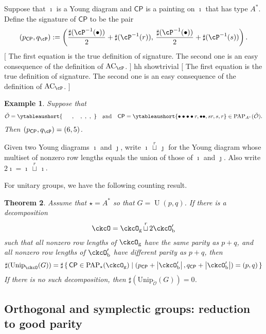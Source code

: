 \documentclass[12pt,a4paper]{amsart}
\let\ytb=\ytableaushort
\newcommand{\trivial}[2][]{\if\relax\detokenize{#1}\relax
  {%
      \color{orange} \vspace{0em} $[$  #2 $]$
      \color{black}
  }
  \else
\ifx#1h
\ifcsname showtrivial\endcsname
{%
    \color{orange} \vspace{0em}  $[$ #2 $]$
    \color{black}
}
\fi
\else {\red Wrong argument!} \fi
\fi
}
\newcommand{\AC}{\mathrm{AC}}
\def\abs#1{\left|{#1}\right|}
\newcommand{\CO}{{\mathcal {O}}}
\newcommand{\CP}{{\mathcal {P}}}
\newcommand{\oU}{\operatorname{U}}
\numberwithin{equation}{section}
\newtheorem{thm}{Theorem}[section]
\newtheorem{eg}[thm]{Example}
\theoremstyle{remark}
\def\Unip{\mathrm{Unip}}
\def\CP{\mathsf{CP}}
\def\cuprow{{\stackrel{r}{\sqcup}}}
\def\cuprow{{\,\stackrel{r}{\sqcup}\,}}
\def\ckcOpb{\ckcO'_{\mathrm b}}
\def\ckcOg{\ckcO_{\mathrm g}}
\begin{document}
Suppose that $\imath$ is a Young diagram and $\CP$ is a painting on $\imath$
that has type $A^*$. Define the signature of $\CP$ to be the pair
\[
    (p_\CP, q_\cP): = \left (\frac{\sharp(\cP^{-1}(\bullet))}{2}+\sharp(\cP^{-1}(r)),\,
    \frac{ \sharp(\cP^{-1}(\bullet))}{2}+\sharp(\cP^{-1}(s))\right).
\]
\trivial[h]{ The first equation is the true definition of signature. The second
  one is an easy consequence of the definition of $\AC_\cP$. }

\begin{eg}
  Suppose
  that \[ \check \CO=\ytb{\ \ \ \ \ , \ \ \ , \ , \ , \ }\quad \textrm{and}\quad \CP=\ytb{\bullet\bullet\bullet\bullet r,\bullet\bullet , sr,s,r}\in \mathrm{PAP}_{A^*}(\check \CO) .
  \]
  Then $(p_\CP, q_\cP)=(6,5)$.

\end{eg}

Given two Young diagrams $\imath$ and $\jmath$, write $\imath\cuprow \jmath$ for
the Young diagram whose multiset of nonzero row lengths equals the union of
those of $\imath$ and $\jmath$. Also write $2\imath =\imath\cuprow \imath$.

For unitary groups, we have the following counting result.
\begin{thm}
  Assume that $\star=A^*$ so that $G=\oU(p,q)$. If there is a decomposition
  \[
    \ckcO=\ckcOg \cuprow 2\ckcOpb
  \]
  such that all nonzero row lengths of $\ckcOg$ have the same parity as $p+q$,
  and all nonzero row lengths of $\ckcOpb$ have different parity as $p+q$, then
  \[
    \sharp(\Unip_{\ckcO}(G))= \sharp \set{\CP\in \mathrm{PAP}_\star(\ckcOg)|(p_\CP+\abs{\ckcOpb}, q_\CP+\abs{\ckcOpb})=(p,q)}
  \]
  If there is no such decomposition, then $\sharp(\Unip_{\check \CO}(G))=0$.

\end{thm}

\subsection{Orthogonal and symplectic groups: reduction to good parity}
\end{document}
